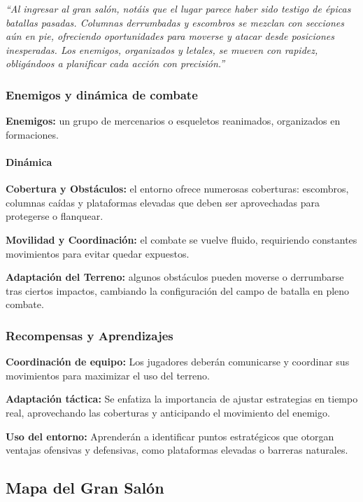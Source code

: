 \documentclass[
  twocolumn]{article}
\begin{document}
\emph{``Al ingresar al gran salón, notáis que el lugar parece haber sido
testigo de épicas batallas pasadas. Columnas derrumbadas y escombros se
mezclan con secciones aún en pie, ofreciendo oportunidades para moverse
y atacar desde posiciones inesperadas. Los enemigos, organizados y
letales, se mueven con rapidez, obligándoos a planificar cada acción con
precisión.''}

\subsubsection{Enemigos y dinámica de
combate}\label{enemigos-y-dinuxe1mica-de-combate}

\textbf{Enemigos:} un grupo de mercenarios o esqueletos reanimados,
organizados en formaciones.

\paragraph{Dinámica}\label{dinuxe1mica-1}

\textbf{Cobertura y Obstáculos:} el entorno ofrece numerosas coberturas:
escombros, columnas caídas y plataformas elevadas que deben ser
aprovechadas para protegerse o flanquear.

\textbf{Movilidad y Coordinación:} el combate se vuelve fluido,
requiriendo constantes movimientos para evitar quedar expuestos.

\textbf{Adaptación del Terreno:} algunos obstáculos pueden moverse o
derrumbarse tras ciertos impactos, cambiando la configuración del campo
de batalla en pleno combate.

\subsubsection{Recompensas y
Aprendizajes}\label{recompensas-y-aprendizajes-3}

\textbf{Coordinación de equipo:} Los jugadores deberán comunicarse y
coordinar sus movimientos para maximizar el uso del terreno.

\textbf{Adaptación táctica:} Se enfatiza la importancia de ajustar
estrategias en tiempo real, aprovechando las coberturas y anticipando el
movimiento del enemigo.

\textbf{Uso del entorno:} Aprenderán a identificar puntos estratégicos
que otorgan ventajas ofensivas y defensivas, como plataformas elevadas o
barreras naturales.

\subsection{Mapa del Gran Salón}\label{mapa-del-gran-saluxf3n}
\end{document}
